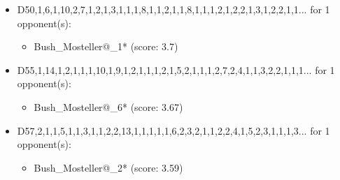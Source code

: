 \begin{appendices}
\begin{itemize}
    \item D50,1,6,1,10,2,7,1,2,1,3,1,1,1,8,1,1,2,1,1,8,1,1,1,2,1,2,2,1,3,1,2,2,1,1... for 1 opponent(s):
    \begin{multicols}{3}
         \begin{itemize}
            \item Bush\_Mosteller@\_1* (score: 3.7)
        \end{itemize}
     \end{multicols}
     
    \item D55,1,14,1,2,1,1,1,10,1,9,1,2,1,1,1,2,1,5,2,1,1,1,2,7,2,4,1,1,3,2,2,1,1,1... for 1 opponent(s):
    \begin{multicols}{3}
         \begin{itemize}
            \item Bush\_Mosteller@\_6* (score: 3.67)
        \end{itemize}
     \end{multicols}
     
    \item D57,2,1,1,5,1,1,3,1,1,2,2,13,1,1,1,1,1,6,2,3,2,1,1,2,2,4,1,5,2,3,1,1,1,3... for 1 opponent(s):
    \begin{multicols}{3}
         \begin{itemize}
            \item Bush\_Mosteller@\_2* (score: 3.59)
        \end{itemize}
     \end{multicols}
     

\end{itemize}
\end{appendices}
